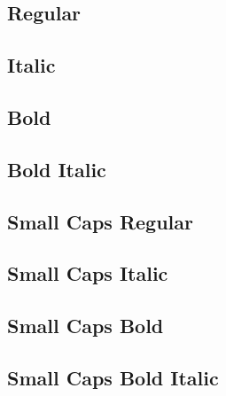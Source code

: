 \documentclass{article}
\begin{document}
\sf\mdseries

\subsection*{Regular}
\lipsum[1]

\subsection*{Italic}
\textit{\lipsum[2]}

\subsection*{Bold}
\textbf{\lipsum[3]}

{\selectfont\lipsum[3]}

\subsection*{Bold Italic}

\textbf{\textit{\lipsum[4]}}

\subsection*{Small Caps Regular}
\textsc{\lipsum[5]}


\subsection*{Small Caps Italic}
\textsc{\textit{\lipsum[6]}}

\subsection*{Small Caps Bold}
\textsc{\textbf{\lipsum[7]}}

\subsection*{Small Caps Bold Italic}

\textsc{\textbf{\textit{\lipsum[8]}}}
\end{document}
